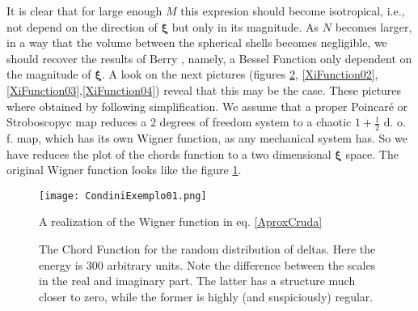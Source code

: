\documentclass[a4paper,12pt]{article}
\newcommand{\xifase}{ {\boldsymbol{\xi}} }
\begin{document}
It is clear that for large enough $M$ this expresion should become
isotropical, i.e., not depend on the direction of $\xifase$ but
only in its magnitude. As $N$ becomes larger, in a
way  that the volume
between the spherical shells becomes negligible, we should recover
the results of Berry \cite{BerryRIR}, namely, a 
Bessel Function only dependent on the magnitude of $\xifase$.
A look on the next pictures (figures \ref{XiFunction01},
\ref{XiFunction02},\ref{XiFunction03},\ref{XiFunction04})
reveal that this may be the case. These pictures where
obtained by following simplification.
We assume that a proper Poincaré or Stroboscopyc map
reduces a 2 degrees of freedom system to a chaotic
$1+\frac{1}{2}$ d. o. f. map, which has its own 
Wigner function, as any mechanical system has. 
So we have reduces the plot of the chords function
to a two dimensional $\xifase$ space. The original 
Wigner function looks like the figure
\ref{WigExample}.


\begin{figure}
\begin{center}
  \texttt{[image: CondiniExemplo01.png]}
\caption{ A realization of the Wigner
function in eq. \ref{AproxCruda}}\label{WigExample}
\end{center}
\end{figure}

\begin{figure}
\begin{center}
\caption{The Chord Function for the random distribution of deltas. 
Here the energy is $300$ arbitrary units. Note the difference between
the scales in the real and imaginary part. The latter has a structure much
closer to zero, while the former is highly (and suspiciously) regular.}
\label{XiFunction01}
\end{center}
\end{figure}
\end{document}
